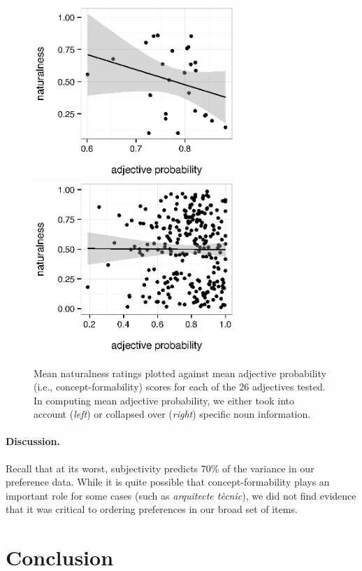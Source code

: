 \documentclass[12pt]{article}
\begin{document}
\renewcommand\thefigure{S.\arabic{figure}}
\begin{figure}
	\centering\includegraphics[width=3in]{plots/naturalness-concept-adjective.eps}\includegraphics[width=3in]{plots/naturalness-concept-noun-pred.eps}
	\caption{Mean naturalness ratings plotted against mean adjective probability (i.e., concept-formability) scores for each of the 26 adjectives tested. In computing mean adjective probability, we either took into account (\emph{left}) or collapsed over (\emph{right}) specific noun information.}\label{fig:concept}
\end{figure}

\paragraph{Discussion.} Recall that at its worst, subjectivity predicts 70\% of the variance in our preference data. 
While it is quite possible that concept-formability plays an important role for some cases (such as \emph{arquitecte t\`{e}cnic}), we did not find evidence that it was critical to ordering preferences in our broad set of items. 

\section{Conclusion}
\end{document}
